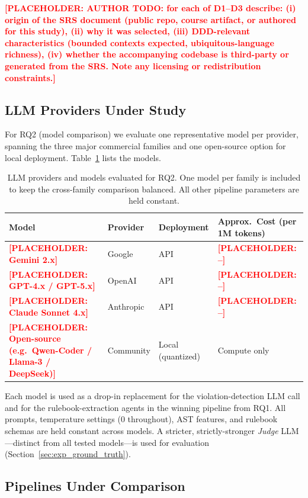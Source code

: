 \documentclass[smallextended]{svjour3}
\newcommand{\placeholder}[1]{\textcolor{red}{\textbf{[PLACEHOLDER: #1]}}}
\begin{document}
\placeholder{AUTHOR TODO: for each of D1--D3 describe: (i) origin of the SRS document (public repo, course artifact, or authored for this study), (ii) why it was selected, (iii) DDD-relevant characteristics (bounded contexts expected, ubiquitous-language richness), (iv) whether the accompanying codebase is third-party or generated from the SRS. Note any licensing or redistribution constraints.}

\subsection{LLM Providers Under Study}
\label{sec:exp_models}

For RQ2 (model comparison) we evaluate one representative model per provider, spanning the three major commercial families and one open-source option for local deployment.
Table~\ref{tab:models} lists the models.

\begin{table}[t]
\caption{LLM providers and models evaluated for RQ2. One model per family is included to keep the cross-family comparison balanced. All other pipeline parameters are held constant.}
\label{tab:models}
\centering
\begin{tabular}{l l l l}
\toprule
\textbf{Model} & \textbf{Provider} & \textbf{Deployment} & \textbf{Approx.\ Cost (per 1M tokens)} \\
\midrule
\placeholder{Gemini 2.x} & Google & API & \placeholder{--} \\
\placeholder{GPT-4.x / GPT-5.x} & OpenAI & API & \placeholder{--} \\
\placeholder{Claude Sonnet 4.x} & Anthropic & API & \placeholder{--} \\
\placeholder{Open-source (e.g.\ Qwen-Coder / Llama-3 / DeepSeek)} & Community & Local (quantized) & Compute only \\
\bottomrule
\end{tabular}
\end{table}

Each model is used as a drop-in replacement for the violation-detection LLM call and for the rulebook-extraction agents in the winning pipeline from RQ1.
All prompts, temperature settings (0 throughout), AST features, and rulebook schemas are held constant across models.
A stricter, strictly-stronger \emph{Judge} LLM---distinct from all tested models---is used for evaluation (Section~\ref{sec:exp_ground_truth}).

\subsection{Pipelines Under Comparison}
\label{sec:exp_pipelines}
\end{document}
